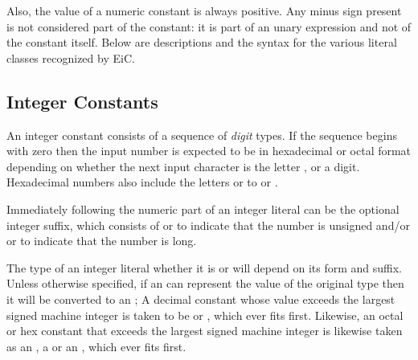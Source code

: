 \begin{production}
\end{production}

Also, the value of a numeric constant is always positive. Any minus
sign present is not considered part of the constant: it is part of an
unary expression and not of the constant itself.  Below are
descriptions and the syntax for the various literal classes recognized
by EiC.

\subsection{Integer Constants}
\label{sec:IntegerConstants}

An integer constant consists of a sequence of {\it digit} types. If
the sequence begins with zero then the input number is expected to be
in hexadecimal or octal format depending on whether the next input
character is the letter
,  or a digit. Hexadecimal numbers also include the
letters  or  to  or .

Immediately following the numeric part of an integer literal can be
the optional integer suffix, which consists of  or  to
indicate that the number is unsigned and/or  or  to indicate
that the number is long. 

The type of an integer literal whether it is  or
 will depend on its form and suffix. Unless otherwise
specified, if an  can represent the value of the original type
then it will be converted to an ; A decimal constant whose
value exceeds the largest signed machine integer is taken to be
 or , which ever fits first. Likewise,
 an octal or hex constant that exceeds the largest signed machine
integer is likewise taken as an , a  or
an , which ever fits first.


